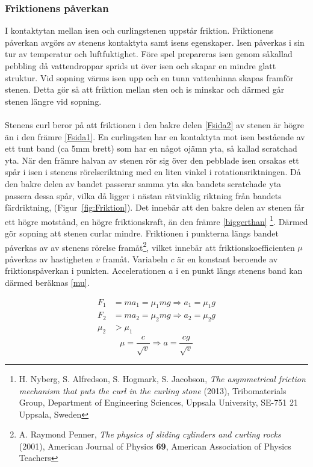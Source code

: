 \documentclass[11pt]{article} %
\begin{document}
\subsubsection{Friktionens påverkan}
I kontaktytan mellan isen och curlingstenen uppstår friktion. 
Friktionens påverkan avgörs av stenens kontaktyta samt isens egenskaper. 
Isen påverkas i sin tur av temperatur och luftfuktighet. 
Före spel prepareras isen genom såkallad pebbling då vattendroppar sprids ut över isen och skapar en mindre glatt struktur.
Vid sopning värms isen upp och en tunn vattenhinna skapas framför stenen. Detta gör så att friktion mellan sten och is minskar och därmed går stenen längre vid sopning.  
\\\\Stenens curl beror på att friktionen i den bakre delen \eqref{Fsida2} av stenen är högre än i den främre \eqref{Fsida1}.  
En curlingsten har en kontaktyta mot isen bestående av ett tunt band (ca 5mm brett) som har en något ojämn yta, så kallad scratchad yta. 
När den främre halvan av stenen rör sig över den pebblade isen orsakas ett spår i isen i stenens rörelseriktning med en liten vinkel i rotationsriktningen. 
Då den bakre delen av bandet passerar samma yta ska bandets scratchade yta passera dessa spår, vilka då ligger i nästan rätvinklig riktning från bandets färdriktning, (Figur~\ref{fig:Friktion}). 
Det innebär att den bakre delen av stenen får ett högre motstånd, en högre friktionskraft, än den främre \eqref{biggerthan}
\footnote{H. Nyberg, S. Alfredson, S. Hogmark, S. Jacobson, \emph{The asymmetrical friction mechanism that puts the curl in the curling stone} (2013), Tribomaterials Group, Department of Engineering Sciences, Uppsala University, SE-751 21 Uppsala, Sweden}.
Därmed gör sopning att stenen curlar mindre. Friktionen i punkterna längs bandet påverkas av av stenens rörelse framåt\footnote{A. Raymond Penner, \emph{The physics of sliding cylinders and curling rocks} (2001), American Journal of Physics \textbf{69}, American Association of Physics Teachers},
vilket innebär att friktionskoefficienten $\mu$ påverkas av hastigheten $v$ framåt. Variabeln $c$ är en konstant beroende av friktionspåverkan i punkten. Accelerationen $a$ i en punkt längs stenens band kan därmed beräknas \eqref{mu}.

 \begin{align}\label{Fsida1}
 F_1& = ma_1 = \mu_1 mg \Rightarrow a_1 = \mu_1 g \\\label{Fsida2}
 F_2& = ma_2 = \mu_2 mg \Rightarrow a_2 = \mu_2g \\\label{biggerthan}
 \mu_2& > \mu_1
 \end{align}
\begin{equation}\label{mu} 
\mu = \frac{c}{\sqrt{v}} \Rightarrow a = \frac{cg}{\sqrt{v}} 
\end{equation}
\end{document}
